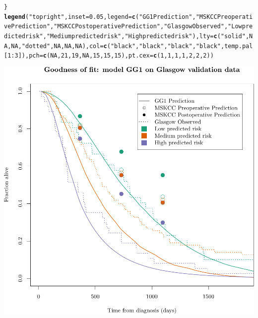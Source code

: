 \documentclass{article}\usepackage[]{graphicx}\usepackage[]{color}
\makeatletter
\def\maxwidth{ %
  \ifdim\Gin@nat@width>\linewidth
    \linewidth
  \else
    \Gin@nat@width
  \fi
}
\newcommand{\hlnum}[1]{\textcolor[rgb]{0.686,0.059,0.569}{#1}}%
\newcommand{\hlstr}[1]{\textcolor[rgb]{0.192,0.494,0.8}{#1}}%
\newcommand{\hlopt}[1]{\textcolor[rgb]{0,0,0}{#1}}%
\newcommand{\hlstd}[1]{\textcolor[rgb]{0.345,0.345,0.345}{#1}}%
\newcommand{\hlkwc}[1]{\textcolor[rgb]{0.333,0.667,0.333}{#1}}%
\newcommand{\hlkwd}[1]{\textcolor[rgb]{0.737,0.353,0.396}{\textbf{#1}}}%
\newenvironment{kframe}{%
 \def\at@end@of@kframe{}%
 \ifinner\ifhmode%
  \def\at@end@of@kframe{\end{minipage}}%
  \begin{minipage}{\columnwidth}%
 \fi\fi%
 \def\FrameCommand##1{\hskip\@totalleftmargin \hskip-\fboxsep
 \colorbox{shadecolor}{##1}\hskip-\fboxsep
     \hskip-\linewidth \hskip-\@totalleftmargin \hskip\columnwidth}%
 \MakeFramed {\advance\hsize-\width
   \@totalleftmargin\z@ \linewidth\hsize
   \@setminipage}}%
 {\par\unskip\endMakeFramed%
 \at@end@of@kframe}
\newenvironment{knitrout}{}{} %
\makeatother
\begin{document}
\begin{knitrout}
\begin{kframe}
\begin{alltt}
\hlstd{\}}
\hlkwd{legend}\hlstd{(}\hlstr{"topright"}\hlstd{,} \hlkwc{inset} \hlstd{=} \hlnum{0.05}\hlstd{,} \hlkwc{legend} \hlstd{=} \hlkwd{c}\hlstd{(}\hlstr{"GG1 Prediction"}\hlstd{,} \hlstr{"MSKCC Preoperative Prediction"}\hlstd{,} \hlstr{"MSKCC Postoperative Prediction"}\hlstd{,} \hlstr{"Glasgow Observed"}\hlstd{,} \hlstr{"Low predicted risk"}\hlstd{,} \hlstr{"Medium predicted risk"}\hlstd{,} \hlstr{"High predicted risk"}\hlstd{),} \hlkwc{lty} \hlstd{=} \hlkwd{c}\hlstd{(}\hlstr{"solid"}\hlstd{,} \hlnum{NA}\hlstd{,} \hlnum{NA}\hlstd{,} \hlstr{"dotted"}\hlstd{,} \hlnum{NA}\hlstd{,} \hlnum{NA}\hlstd{,} \hlnum{NA}\hlstd{),} \hlkwc{col} \hlstd{=} \hlkwd{c}\hlstd{(}\hlstr{"black"}\hlstd{,} \hlstr{"black"}\hlstd{,} \hlstr{"black"}\hlstd{,} \hlstr{"black"}\hlstd{, temp.pal[}\hlnum{1}\hlopt{:}\hlnum{3}\hlstd{]),} \hlkwc{pch} \hlstd{=} \hlkwd{c}\hlstd{(}\hlnum{NA}\hlstd{,} \hlnum{21}\hlstd{,} \hlnum{19}\hlstd{,} \hlnum{NA}\hlstd{,} \hlnum{15}\hlstd{,} \hlnum{15}\hlstd{,} \hlnum{15}\hlstd{),} \hlkwc{pt.cex} \hlstd{=} \hlkwd{c}\hlstd{(}\hlnum{1}\hlstd{,} \hlnum{1}\hlstd{,} \hlnum{1}\hlstd{,} \hlnum{1}\hlstd{,} \hlnum{2}\hlstd{,} \hlnum{2}\hlstd{,} \hlnum{2}\hlstd{))}
\end{alltt}
\end{kframe}

{\centering \includegraphics[width=\maxwidth]{figure/07-altman-4-glasgow-1} 

}
\end{knitrout}
\end{document}
